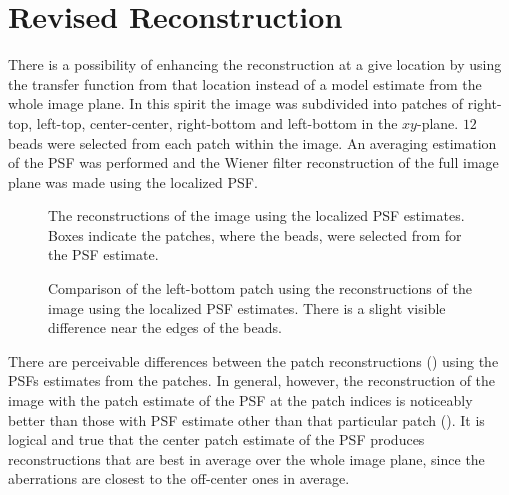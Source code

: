 
\section[New Reconstruction]{Revised Reconstruction}%


There is a possibility of enhancing the reconstruction at a give location by using the transfer function from that
    location instead of a model estimate from the whole image plane.
In this spirit the image was subdivided into patches of right-top, left-top, center-center, right-bottom and left-bottom
    in the \(xy\)-plane.
\(12\) beads were selected from each patch within the image.
An averaging estimation of the \ac{PSF} was performed and the Wiener filter reconstruction of the full image plane was 
    made using the localized \ac{PSF}.

\begin{figure}
    \caption{
        The reconstructions of the image using the localized \ac{PSF} estimates.
        Boxes indicate the patches, where the beads, were selected from for the \ac{PSF} estimate.
    }
\end{figure}

\begin{figure}
    \caption{
        Comparison of the left-bottom patch using the reconstructions of the image using the localized \ac{PSF} 
            estimates.
        There is a slight visible difference near the edges of the beads.
    }
\end{figure}

There are perceivable differences between the patch reconstructions 
    () using the \acp{PSF} estimates from the patches.
In general, however, the reconstruction of the image with the patch estimate of the \ac{PSF} at the patch indices is
    noticeably better than those with \ac{PSF} estimate other than that particular patch 
    ().
It is logical and true that the center patch estimate of the \ac{PSF} produces reconstructions that are best in average
    over the whole image plane, since the aberrations are closest to the off-center ones in average.

